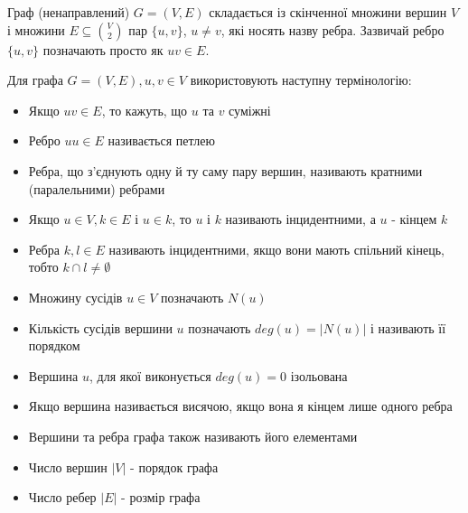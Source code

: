 Граф (ненаправлений) $G = (V,E)$ складається із скінченної множини вершин $V$ і множини $E \subseteq {V \choose 2}$ пар $\{u,v\}$, $u \neq v$, які носять назву ребра.
Зазвичай ребро $\lbrace u,v \rbrace$ позначають просто як $uv \in E$.

Для графа $G = (V,E), u,v \in V$ використовують наступну термінологію:
\begin{itemize}
        \item Якщо $uv \in E$, то кажуть, що $u$ та $v$ суміжні
        \item Ребро $uu \in E$ називається петлею
        \item Ребра, що з'єднують одну й ту саму пару вершин, називають кратними (паралельними) ребрами
        \item Якщо $u \in V, k \in E$ і $u \in k$, то $u$ і $k$ називають інцидентними, а $u$ - кінцем $k$
        \item Ребра $k,l \in E$ називають інцидентними, якщо вони мають спільний кінець, тобто $k \cap l \ne \emptyset$
        \item Множину сусідів $u \in V$ позначають $N(u)$
        \item Кількість сусідів вершини $u$ позначають $deg(u) = \vert N(u) \vert$ і називають її порядком
        \item Вершина $u$, для якої виконується $deg(u) = 0$ ізольована
        \item Якщо вершина називається висячою, якщо вона я кінцем лише одного ребра
        \item Вершини та ребра графа також називають його елементами
        \item Число вершин $\vert V \vert$ - порядок графа
        \item Число ребер $\vert E \vert$ - розмір графа
\end{itemize}

